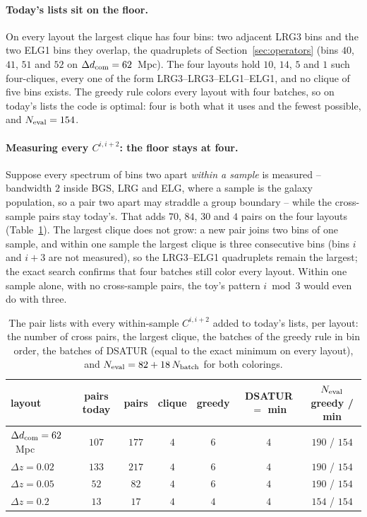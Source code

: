 \documentclass[11pt]{article}
\begin{document}
\paragraph{Today's lists sit on the floor.}
On every layout the largest clique has four bins: two adjacent LRG3
bins and the two ELG1 bins they overlap, the quadruplets of
Section~\ref{sec:operators} (bins $40$, $41$, $51$ and $52$ on
$\Delta d_{\rm com} = 62$~Mpc).  The four layouts hold $10$, $14$, $5$
and $1$ such four-cliques, every one of the form
LRG3--LRG3--ELG1--ELG1, and no clique of five bins exists.  The greedy
rule colors every layout with four batches, so on today's lists the
code is optimal: four is both what it uses and the fewest possible,
and $N_{\rm eval} = 154$.

\paragraph{Measuring every $C^{i,i+2}$: the floor stays at four.}
Suppose every spectrum of bins two apart \emph{within a sample} is
measured -- bandwidth $2$ inside BGS, LRG and ELG, where a sample is
the galaxy population, so a pair two apart may straddle a group
boundary -- while the cross-sample pairs stay today's.  That adds
$70$, $84$, $30$ and $4$ pairs on the four layouts
(Table~\ref{tab:morepairs}).  The largest clique does not grow: a new
pair joins two bins of one sample, and within one sample the largest
clique is three consecutive bins (bins $i$ and $i + 3$ are not
measured), so the LRG3--ELG1 quadruplets remain the largest; the exact
search confirms that four batches still color every layout.  Within
one sample alone, with no cross-sample pairs, the toy's pattern
$i \bmod 3$ would even do with three.

\begin{table}[tbp]
  \centering
  \setlength{\tabcolsep}{4pt}
  \begin{tabular}{lcccccc}
    \hline
    layout & pairs today & pairs & clique & greedy & DSATUR $=$ min
      & $N_{\rm eval}$ greedy / min \\
    \hline
    $\Delta d_{\rm com} = 62$~Mpc & $107$ & $177$ & $4$ & $6$ & $4$
      & $190$ / $154$ \\
    $\Delta z = 0.02$ & $133$ & $217$ & $4$ & $6$ & $4$
      & $190$ / $154$ \\
    $\Delta z = 0.05$ & $52$ & $82$ & $4$ & $6$ & $4$
      & $190$ / $154$ \\
    $\Delta z = 0.2$ & $13$ & $17$ & $4$ & $4$ & $4$
      & $154$ / $154$ \\
    \hline
  \end{tabular}
  \caption{The pair lists with every within-sample $C^{i,i+2}$ added
    to today's lists, per layout: the number of cross pairs, the
    largest clique, the batches of the greedy rule in bin order, the
    batches of DSATUR (equal to the exact minimum on every layout),
    and $N_{\rm eval} = 82 + 18\,N_{\rm batch}$ for both colorings.}
  \label{tab:morepairs}
\end{table}
\end{document}
